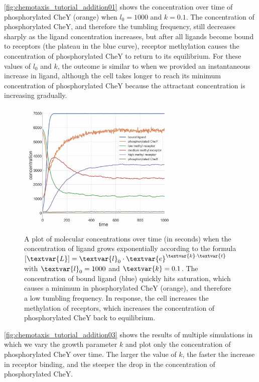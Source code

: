 \autoref{fig:chemotaxis_tutorial_addition01} shows the concentration over time of phosphorylated CheY (orange) when $l_0 = 1000$ and $k = 0.1$. The concentration of phosphorylated CheY, and therefore the tumbling frequency, still decreases sharply as the ligand concentration increases, but after all ligands become bound to receptors (the plateau in the blue curve), receptor methylation causes the concentration of phosphorylated CheY to return to its equilibrium. For these values of $l_0$ and $k$, the outcome is similar to when we provided an instantaneous increase in ligand, although the cell takes longer to reach its minimum concentration of phosphorylated CheY because the attractant concentration is increasing gradually.

\begin{figure}[h]
\centering
\mySfFamily
\includegraphics[width = 0.7\textwidth]{../images_CMYK/chemotaxis_tutorial_addition01_vscode}
\caption{A plot of molecular concentrations over time (in seconds) when the concentration of ligand grows exponentially according to the formula  $[\textvar{L}] = \textvar{l}_\text{0} \cdot \textvar{e}^{\textvar{k} \cdot \textvar{t}}$ with $\textvar{l}_\text{0} = \text{1000}$ and $\textvar{k} = \text{0.1}$. The concentration of bound ligand (blue) quickly hits saturation, which causes a minimum in phosphorylated CheY (orange), and therefore a low tumbling frequency. In response, the cell increases the methylation of receptors, which increases the concentration of phosphorylated CheY back to equilibrium.}
\label{fig:chemotaxis_tutorial_addition01}
\end{figure}

\autoref{fig:chemotaxis_tutorial_addition03} shows the results of multiple simulations in which we vary the growth parameter $k$ and plot only the concentration of phosphorylated CheY over time. The larger the value of $k$, the faster the increase in receptor binding, and the steeper the drop in the concentration of phosphorylated CheY.

